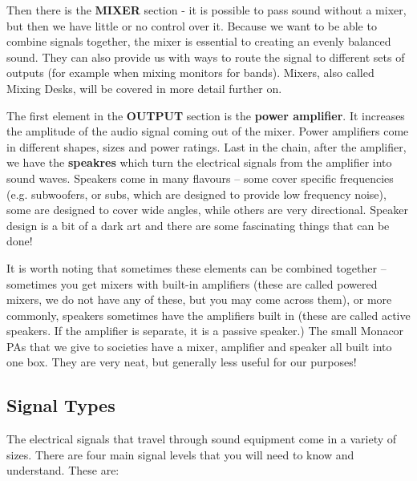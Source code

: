 \documentclass[14pt]{article} %
\begin{document}
Then there is the \textbf{MIXER} section - it is possible to pass sound without a mixer, but then we have little or no control over it. Because we want to be able to combine signals together, the mixer is essential to creating an evenly balanced sound. They can also provide us with ways to route the signal to different sets of outputs (for example when mixing monitors for bands). Mixers, also called Mixing Desks, will be covered in more detail further on.

The first element in the \textbf{OUTPUT} section is the \textbf{power amplifier}. It increases the amplitude of the audio signal coming out of the mixer. Power amplifiers come in different shapes, sizes and power ratings. Last in the chain, after the amplifier, we have the \textbf{speakres} which turn the electrical signals from the amplifier into
sound waves. Speakers come in many flavours – some cover specific frequencies (e.g. subwoofers, or subs, which are designed to provide low frequency noise), some are designed to cover wide angles, while others are very directional. Speaker design is a bit of a dark art and there are some fascinating things that can be done!

It is worth noting that sometimes these elements can be combined together – sometimes you get mixers with built-in amplifiers (these are called powered mixers, we do not have any of these, but you may come across them), or more commonly, speakers sometimes have the amplifiers built in (these are called active speakers. If the amplifier is separate, it is a passive speaker.) The small Monacor PAs that we give to societies have a mixer, amplifier and speaker all built into one box. They are very neat, but generally less useful for our purposes!

\subsection{Signal Types}
\label{signal-types}
The electrical signals that travel through sound equipment come in a variety of sizes.
There are four main signal levels that you will need to know and understand. These are:
\end{document}
